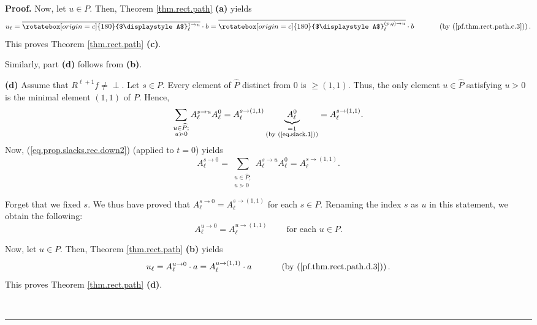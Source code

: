 \documentclass[numbers=enddot,12pt,final,onecolumn,notitlepage]{scrartcl}%
\theoremstyle{definition}
\newenvironment{verlong}{}{}
\newenvironment{vershort}{}{}
\newcommand{\undf}{\operatorname*{\bot}}
\newcommand{\upslack}{\mathchoice{\rotatebox[origin=c]{180}{$\displaystyle A$}}{\rotatebox[origin=c]{180}{$\textstyle A$}}{\rotatebox[origin=c]{180}{$\scriptstyle A$}}{\rotatebox[origin=c]{180}{$\scriptscriptstyle A$}}}
\newcommand{\downslack}{A}
\newenvironment{proof}[1][Proof]{\noindent\textbf{#1.} }{\ \rule{0.5em}{0.5em}}
\let\sumnonlimits\sum
\renewcommand{\sum}{\sumnonlimits\limits}
\begin{document}
\begin{proof}
\begin{verlong}
Now, let $u\in P$. Then, Theorem \ref{thm.rect.path} \textbf{(a)} yields
\[
u_{\ell}=\overline{\upslack_{\ell}^{1\rightarrow u}}\cdot b=\overline
{\upslack_{\ell}^{\left(  p,q\right)  \rightarrow u}}\cdot
b\ \ \ \ \ \ \ \ \ \ \left(  \text{by (\ref{pf.thm.rect.path.c.3})}\right)  .
\]
This proves Theorem \ref{thm.rect.path} \textbf{(c)}. \medskip
\end{verlong}

\begin{vershort}
Similarly, part \textbf{(d)} follows from \textbf{(b)}. \qedhere

\end{vershort}

\begin{verlong}
\textbf{(d)} Assume that $R^{\ell+1}f\neq\undf$. Let $s\in P$. Every element
of $\widehat{P}$ distinct from $0$ is $\geq\left(  1,1\right)  $. Thus, the
only element $u\in\widehat{P}$ satisfying $u\gtrdot0$ is the minimal element
$\left(  1,1\right)  $ of $P$. Hence,
\[
\sum_{\substack{u\in\widehat{P};\\u\gtrdot0}}\downslack_{\ell}^{s\rightarrow
u}\downslack_{\ell}^{0}=\downslack_{\ell}^{s\rightarrow\left(  1,1\right)
}\underbrace{\downslack_{\ell}^{0}}_{\substack{=1\\\text{(by (\ref{eq.slack.1}%
))}}}=\downslack_{\ell}^{s\rightarrow\left(  1,1\right)  }.
\]
Now, (\ref{eq.prop.slacks.rec.down2}) (applied to $t=0$) yields%
\[
\downslack_{\ell}^{s\rightarrow0}=\sum_{\substack{u\in\widehat{P};\\u\gtrdot
0}}\downslack_{\ell}^{s\rightarrow u}\downslack_{\ell}^{0}=\downslack_{\ell
}^{s\rightarrow\left(  1,1\right)  }.
\]


Forget that we fixed $s$. We thus have proved that $\downslack_{\ell
}^{s\rightarrow0}=\downslack_{\ell}^{s\rightarrow\left(  1,1\right)  }$ for
each $s\in P$. Renaming the index $s$ as $u$ in this statement, we obtain the
following:%
\begin{equation}
\downslack_{\ell}^{u\rightarrow0}=\downslack_{\ell}^{u\rightarrow\left(
1,1\right)  }\ \ \ \ \ \ \ \ \ \ \text{for each }u\in P.
\label{pf.thm.rect.path.d.3}%
\end{equation}


Now, let $u\in P$. Then, Theorem \ref{thm.rect.path} \textbf{(b)} yields
\[
u_{\ell}=\downslack_{\ell}^{u\rightarrow0}\cdot a=\downslack_{\ell
}^{u\rightarrow\left(  1,1\right)  }\cdot a\ \ \ \ \ \ \ \ \ \ \left(
\text{by (\ref{pf.thm.rect.path.d.3})}\right)  .
\]
This proves Theorem \ref{thm.rect.path} \textbf{(d)}. \qedhere

\end{verlong}
\end{proof}
\end{document}
